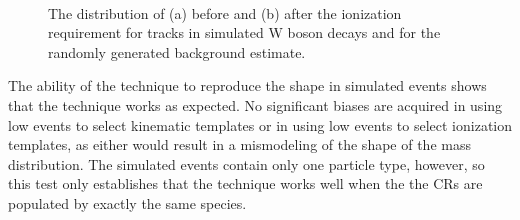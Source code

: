 \begin{figure}[h]
\centering
{}
\\
\caption{The distribution of \mdedx (a) before and (b) after the ionization requirement for tracks in simulated W boson decays and for the randomly generated background estimate.}
\label{fig:closure_mass}
\end{figure}

The ability of the technique to reproduce the shape in simulated events shows that the technique works as expected.
No significant biases are acquired in using low \dedx events to select kinematic templates or in using low \met events to select ionization templates, as either would result in a mismodeling of the shape of the mass distribution.
The simulated events contain only one particle type, however, so this test only establishes that the technique works well when the the \acp{CR} are populated by exactly the same species.


